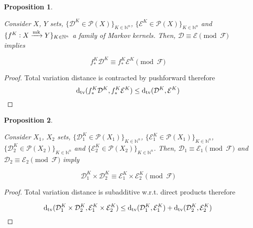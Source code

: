 \documentclass[11pt]{article}
\numberwithin{equation}{section}
\theoremstyle{definition}
\theoremstyle{plain}
\newtheorem{proposition}{Proposition}[section]
\newcommand{\Dtv}{\operatorname{d}_{\textnormal{tv}}}
\newcommand{\Nats}{\mathbb{N}}
\newcommand{\Dist}{\mathcal{D}}
\newcommand{\Fall}{\mathcal{F}}
\newcommand{\Markov}{\xrightarrow{\textnormal{mk}}}
\begin{document}
\begin{samepage}
\begin{proposition}
\label{prp:prob_cong_push}

Consider $X$, $Y$ sets, $\{\Dist^K \in \mathcal{P}(X)\}_{K \in \Nats^n}$, $\{\mathcal{E}^K \in \mathcal{P}(X)\}_{K \in \Nats^n}$ and\\ $\{f^K: X \Markov Y\}_{K \in \Nats^n}$ a family of Markov kernels. Then, $\Dist \equiv \mathcal{E} \pmod \Fall$ implies

\begin{equation}
f_*^K\Dist^K \equiv f_*^K\mathcal{E}^K \pmod \Fall
\end{equation}

\end{proposition}
\end{samepage}

\begin{proof}

Total variation distance is contracted by pushforward therefore \[\Dtv(f_*^K\Dist^K, f_*^K\mathcal{E}^K) \leq \Dtv(\Dist^K, \mathcal{E}^K)\]
\end{proof}

\begin{samepage}
\begin{proposition}
\label{prp:prob_cong_dir}

Consider $X_1$, $X_2$ sets, $\{\Dist_1^K \in \mathcal{P}(X_1)\}_{K \in \Nats^n}$, $\{\mathcal{E}_1^K \in \mathcal{P}(X_1)\}_{K \in \Nats^n}$,\\ $\{\Dist_2^K \in \mathcal{P}(X_2)\}_{K \in \Nats^n}$ and $\{\mathcal{E}_2^K \in \mathcal{P}(X_2)\}_{K \in \Nats^n}$. Then, $\Dist_1 \equiv \mathcal{E}_1 \pmod \Fall$ and $\Dist_2 \equiv \mathcal{E}_2 \pmod \Fall$ imply

\begin{equation}
\Dist_1^K \times \Dist_2^K \equiv \mathcal{E}_1^K \times \mathcal{E}_2^K \pmod \Fall
\end{equation}

\end{proposition}
\end{samepage}

\begin{proof}

Total variation distance is subadditive w.r.t. direct products therefore 

\[\Dtv(\Dist_1^K \times \Dist_2^K, \mathcal{E}_1^K \times \mathcal{E}_2^K) \leq \Dtv(\Dist_1^K, \mathcal{E}_1^K) + \Dtv(\Dist_2^K, \mathcal{E}_2^K)\]
\end{proof}
\end{document}
